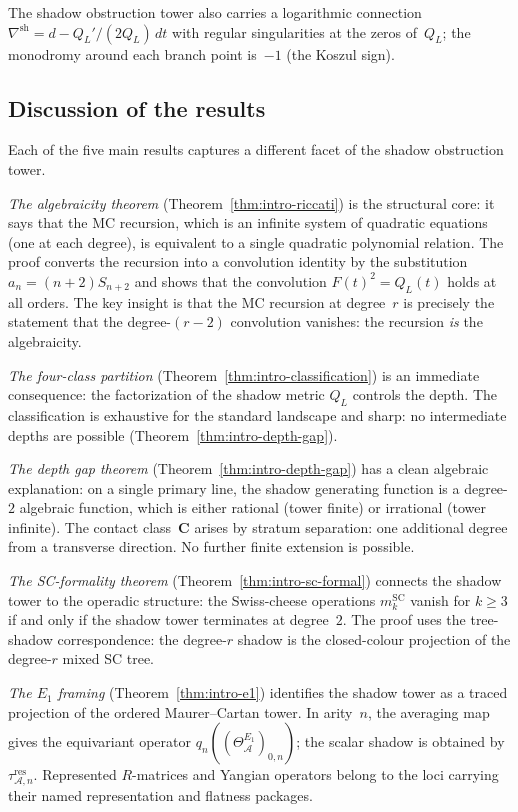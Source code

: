 \documentclass[11pt,reqno]{amsart}
\theoremstyle{definition}
\theoremstyle{remark}
\newcommand{\cA}{\mathcal{A}}
\numberwithin{equation}{section}
\begin{document}
The shadow obstruction tower also carries a logarithmic
connection $\nabla^{\mathrm{sh}} = d - Q_L'/(2Q_L)\,dt$ with
regular singularities at the zeros of~$Q_L$; the monodromy
around each branch point is~$-1$ (the Koszul sign).

\subsection{Discussion of the
results}\label{subsec:intro-discussion}

Each of the five main results captures a different facet of
the shadow obstruction tower.

\emph{The algebraicity theorem}
(Theorem~\ref{thm:intro-riccati}) is the structural core:
it says that the MC recursion, which is an infinite system
of quadratic equations (one at each degree), is equivalent
to a single quadratic polynomial relation. The proof
converts the recursion into a convolution identity by the
substitution $a_n = (n+2)S_{n+2}$ and shows that the
convolution $F(t)^2 = Q_L(t)$ holds at all orders. The
key insight is that the MC recursion at degree~$r$ is
precisely the statement that the degree-$(r-2)$ convolution
vanishes: the recursion \emph{is} the algebraicity.

\emph{The four-class partition}
(Theorem~\ref{thm:intro-classification}) is an immediate
consequence: the factorization of the shadow metric $Q_L$
controls the depth. The classification is exhaustive for
the standard landscape and sharp: no intermediate depths
are possible (Theorem~\ref{thm:intro-depth-gap}).

\emph{The depth gap theorem}
(Theorem~\ref{thm:intro-depth-gap}) has a clean algebraic
explanation: on a single primary line, the shadow generating
function is a degree-$2$ algebraic function, which is either
rational (tower finite) or irrational (tower infinite).
The contact class~$\mathbf{C}$ arises by stratum
separation: one additional degree from a transverse
direction. No further finite extension is possible.

\emph{The SC-formality theorem}
(Theorem~\ref{thm:intro-sc-formal}) connects the shadow
tower to the operadic structure: the Swiss-cheese operations
$m_k^{\mathrm{SC}}$ vanish for $k \ge 3$ if and only if
the shadow tower terminates at degree~$2$. The proof uses
the tree-shadow correspondence: the degree-$r$ shadow is the
closed-colour projection of the degree-$r$ mixed SC tree.

\emph{The $E_1$ framing}
(Theorem~\ref{thm:intro-e1}) identifies the shadow tower as a traced
projection of the ordered Maurer--Cartan tower.  In arity~$n$, the
averaging map gives the equivariant operator
$q_n((\Theta_\cA^{E_1})_{0,n})$; the scalar shadow is obtained by
$\tau_{\cA,n}^{\mathrm{res}}$.  Represented $R$-matrices and Yangian
operators belong to the loci carrying their named representation and
flatness packages.
\end{document}

